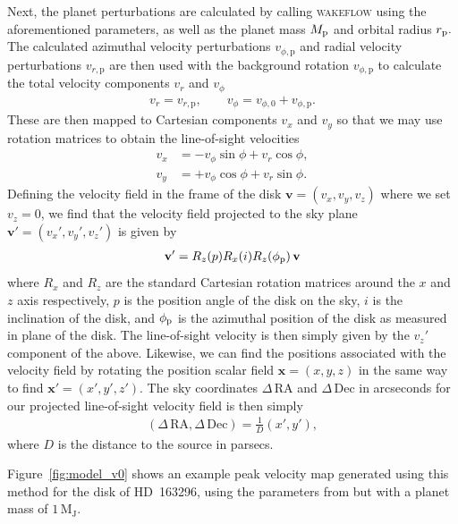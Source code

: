 Next, the planet perturbations are calculated by calling \textsc{wakeflow} using the aforementioned parameters, as well as the planet mass $M_{\rm p}$ and orbital radius $r_{\rm p}.$
The calculated azimuthal velocity perturbations $v_{\phi,\mathrm{p}}$ and radial velocity perturbations $v_{r,\mathrm{p}}$ are then used with the background rotation $v_{\phi,\mathrm{p}}$ to calculate the total velocity components $v_r$ and $v_\phi$
\begin{align}
    v_r = v_{r,\mathrm{p}}, \qquad v_\phi = v_{\phi,\mathrm{0}} + v_{\phi,\mathrm{p}}.
\end{align}
These are then mapped to Cartesian components $v_x$ and $v_y$ so that we may use rotation matrices to obtain the line-of-sight velocities 
\begin{align}
    v_x &= -v_\phi \sin \phi + v_r \cos \phi, \\
    v_y &= +v_\phi \cos \phi + v_r \sin \phi.
\end{align}
Defining the velocity field in the frame of the disk $\mathbf{v} = (v_x, v_y, v_z)$ where we set $v_z=0$, we find that the velocity field projected to the sky plane $\mathbf{v'}=(v_x', v_y', v_z')$ is given by 
\begin{align}
    \mathbf{v'} =  R_z(p) R_x(i) R_z(\phi_{\rm p}) \, \mathbf{v}
\end{align}
where $R_x$ and $R_z$ are the standard Cartesian rotation matrices around the $x$ and $z$ axis respectively, $p$ is the position angle of the disk on the sky, $i$ is the inclination of the disk, and $\phi_{\rm p}$ is the azimuthal position of the disk as measured in plane of the disk.
The line-of-sight velocity is then simply given by the $v_z'$ component of the above.
Likewise, we can find the positions associated with the velocity field by rotating the position scalar field $\mathbf{x} = (x,y,z)$ in the same way to find $\mathbf{x'} = (x',y',z')$.
The sky coordinates $\Delta \, \mathrm{RA}$ and $\Delta \, \mathrm{Dec}$ in arcseconds for our projected line-of-sight velocity field is then simply
\begin{align}
    (\Delta \, \mathrm{RA}, \Delta \,\mathrm{Dec}) = \frac{1}{D} (x', y'),
\end{align}
where $D$ is the distance to the source in parsecs.

Figure~\ref{fig:model_v0} shows an example peak velocity map generated using this method for the disk of HD~163296, using the parameters from \citet{calcino2022} but with a planet mass of $1 \, \mathrm{M_J}$.

